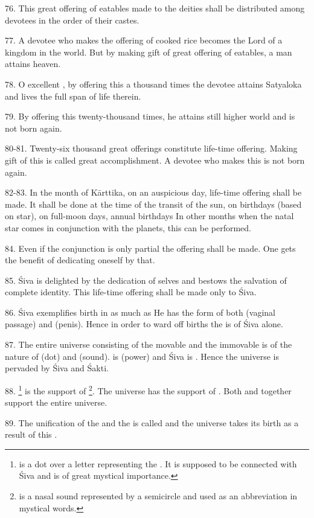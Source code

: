 76. This great offering of eatables made to the deities shall be distributed
among devotees in the order of their castes.

77. A devotee who makes the offering of cooked rice becomes the Lord of
a kingdom in the world. But by making gift of great offering of eatables,
a man attains heaven.

78. O excellent , by offering this a thousand times the devotee
attains Satyaloka and lives the full span of life therein.

79. By offering this twenty-thousand times, he attains still higher world and
is not born again.

80-81. Twenty-six thousand great offerings constitute life-time offering. Making
gift of this is called great accomplishment. A devotee who makes this is not
born again.

82-83. In the month of Kārttika, on an auspicious day, life-time offering shall
be made. It shall be done at the time of the transit of the sun, on birthdays
(based on star), on full-moon days, annual birthdays \etc In other months when
the natal star comes in conjunction with the planets, this can be performed.

84. Even if the conjunction is only partial the offering shall be made. One gets
the benefit of dedicating oneself by that.

85. Śiva is delighted by the dedication of selves and bestows the salvation of
complete identity. This life-time offering shall be made only to Śiva.

86. Śiva exemplifies birth in as much as He has the form of both 
(vaginal passage) and  (penis). Hence in order to ward off births
the  is of Śiva alone.

87. The entire universe consisting of the movable and the immovable is of
the nature of  (dot) and  (sound).  is 
(power) and Śiva is . Hence the universe is pervaded by Śiva and Śakti.

88. \footnote{ is a dot over a letter representing
the . It is supposed to be connected with Śiva and is of great
mystical importance.} is the support of \footnote{ is a nasal
sound represented by a semicircle and used as an abbreviation in mystical
words.}. The universe has the support of . Both  and
 together support the entire universe.

89. The unification of the  and the  is called
 and the universe takes its birth as a result of this
.

